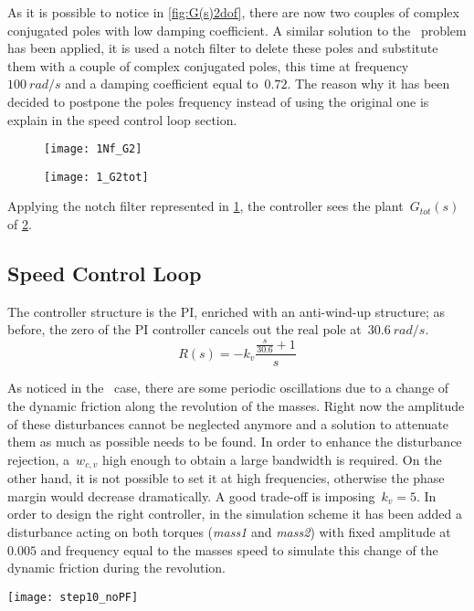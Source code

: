 As it is possible to notice in \cref{fig:G(s)2dof}, there are now two couples of complex conjugated poles with low damping coefficient. A similar solution to the \onedof\ problem has been applied, it is used a notch filter to delete these poles and substitute them with a couple of complex conjugated poles, this time at frequency~$100\ rad/s$ and a damping coefficient equal to~$0.72$. The reason why it has been decided to postpone the poles frequency instead of using the original one is explain in the speed control loop section.


\begin{figure*}[h]
	\centering
	\begin{subfigure}{0.35\columnwidth}
		\texttt{[image: 1Nf\_G2]}
		\label{fig:Notch Filter2}
	\end{subfigure}
	\begin{subfigure}{0.35\columnwidth}
		\texttt{[image: 1\_G2tot]}
		\label{fig:Plant G(s) with Notch Filter2}
	\end{subfigure}
	\caption{Plant $G(s)$ with Notch Filter $N_f(s)$: $G_{tot}$(s)}
\end{figure*}


Applying the notch filter represented in \cref{fig:Notch Filter2}, the controller sees the plant~$G_{tot}(s)$ of \cref{fig:Plant G(s) with Notch Filter2}.

\newpage 
\subsection{Speed Control Loop}
The controller structure is the PI, enriched with an anti-wind-up structure; as before, the zero of the PI controller cancels out the real pole at~$30.6\ rad/s$.
\[
R(s)=-k_v
\frac{\frac{s}{30.6}+1}{s}
\]

As noticed in the \onedof~case, there are some periodic oscillations due to a change of the dynamic friction along the revolution of the masses. Right now the amplitude of these disturbances cannot be neglected anymore and a solution to attenuate them as much as possible needs to be found. In order to enhance the disturbance rejection, a~$w_{c,v}$ high enough to obtain a large bandwidth is required. On the other hand, it is not possible to set it at high frequencies, otherwise the phase margin would decrease dramatically. A good trade-off is imposing~$k_v=5$.
 In order to design the right controller, in the simulation scheme it has been added a disturbance acting on both torques (\textit{mass1} and \textit{mass2}) with fixed amplitude at~$0.005$ and frequency equal to the masses speed to simulate this change of the dynamic friction during the revolution.
\begin{figure*}[h]
	\centering
	\texttt{[image: step10\_noPF]}
	\caption{Step response with $k_v=5 $}
	\label{fig:step10_noPF}
\end{figure*}


